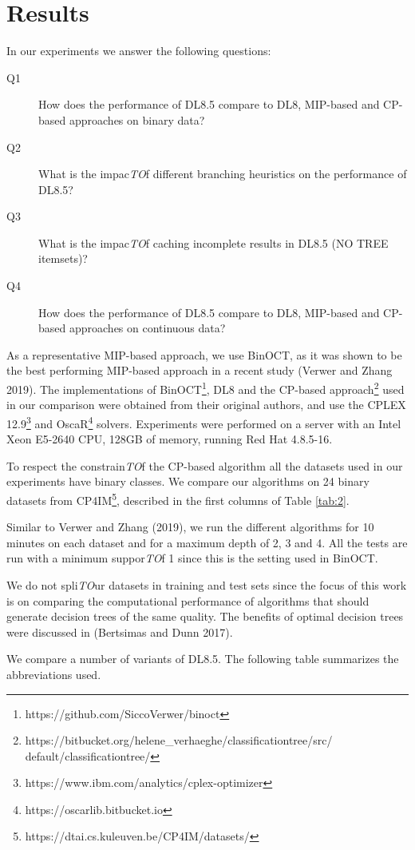 \section{Results}
In our experiments we answer the following questions:
\begin{description}
	\item[Q1] How does the performance of DL8.5 compare to DL8, MIP-based and CP-based approaches on binary data?
	\item[Q2] What is the impac\emph{TO}f different branching heuristics on the performance of DL8.5?
	\item[Q3] What is the impac\emph{TO}f caching incomplete results in DL8.5 (NO TREE itemsets)?
	\item[Q4] How does the performance of DL8.5 compare to DL8, MIP-based and CP-based approaches on continuous data?
\end{description}
As a representative MIP-based approach, we use BinOCT, as it was shown to be the best performing MIP-based approach in a recent study (Verwer and Zhang 2019). The implementations of BinOCT\footnote{https://github.com/SiccoVerwer/binoct}, DL8 and the CP-based approach\footnote{https://bitbucket.org/helene\_verhaeghe/classificationtree/src/ default/classificationtree/} used in our comparison were obtained from their original authors, and use the CPLEX 12.9\footnote{https://www.ibm.com/analytics/cplex-optimizer} and OscaR\footnote{https://oscarlib.bitbucket.io} solvers. Experiments were performed on a server with an Intel Xeon E5-2640 CPU, 128GB of memory, running Red Hat 4.8.5-16.

To respect the constrain\emph{TO}f the CP-based algorithm all the datasets used in our experiments have binary classes. We compare our algorithms on 24 binary datasets from CP4IM\footnote{https://dtai.cs.kuleuven.be/CP4IM/datasets/}, described in the first columns of Table \ref{tab:2}.

Similar to Verwer and Zhang (2019), we run the different algorithms for 10 minutes on each dataset and for a maximum depth of 2, 3 and 4. All the tests are run with a minimum suppor\emph{TO}f 1 since this is the setting used in BinOCT.

We do not spli\emph{TO}ur datasets in training and test sets since the focus of this work is on comparing the computational performance of algorithms that should generate decision trees of the same quality. The benefits of optimal decision trees were discussed in (Bertsimas and Dunn 2017).

We compare a number of variants of DL8.5. The following table summarizes the abbreviations used.

